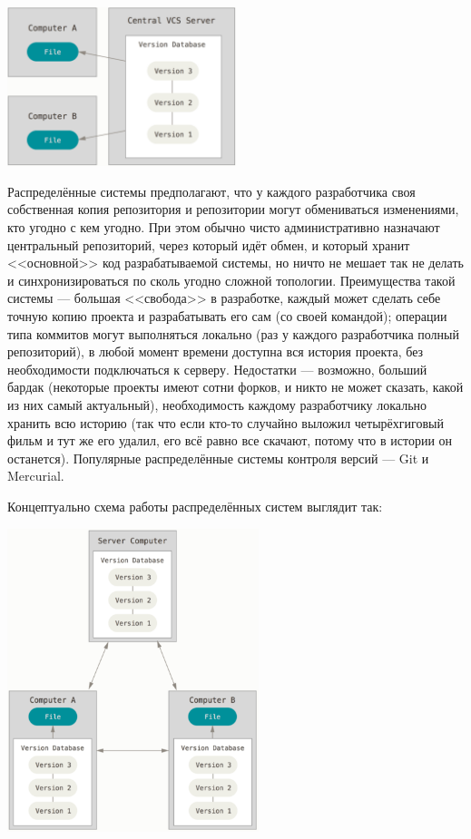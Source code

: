 \documentclass{../text-style}
\begin{document}
\begin{center}
    \includegraphics[width=0.5\textwidth]{centralizedVcs.png}
\end{center}

Распределённые системы предполагают, что у каждого разработчика своя собственная копия репозитория и репозитории могут обмениваться изменениями, кто угодно с кем угодно. При этом обычно чисто административно назначают центральный репозиторий, через который идёт обмен, и который хранит <<основной>> код разрабатываемой системы, но ничто не мешает так не делать и синхронизироваться по сколь угодно сложной топологии. Преимущества такой системы --- большая <<свобода>> в разработке, каждый может сделать себе точную копию проекта и разрабатывать его сам (со своей командой); операции типа коммитов могут выполняться локально (раз у каждого разработчика полный репозиторий), в любой момент времени доступна вся история проекта, без необходимости подключаться к серверу. Недостатки --- возможно, больший бардак (некоторые проекты имеют сотни форков, и никто не может сказать, какой из них самый актуальный), необходимость каждому разработчику локально хранить всю историю (так что если кто-то случайно выложил четырёхгиговый фильм и тут же его удалил, его всё равно все скачают, потому что в истории он останется). Популярные распределённые системы контроля версий --- Git и Mercurial.

Концептуально схема работы распределённых систем выглядит так:

\begin{center}
    \includegraphics[width=0.55\textwidth]{distributedVcs.png}
\end{center}
\end{document}
